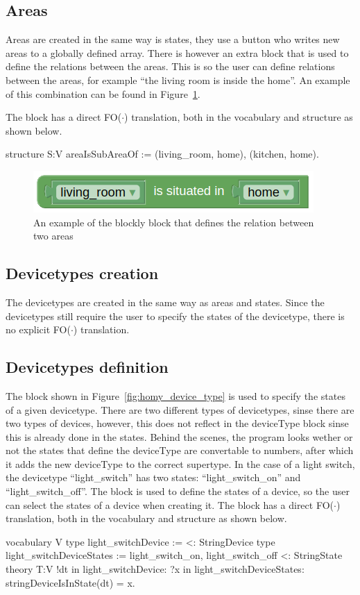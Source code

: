 \documentclass[11pt,a4paper]{report}
\newcommand{\fodot}{FO($\cdot$)\xspace}
\begin{document}
\subsection{Areas}
Areas are created in the same way is states, they use a button who writes new areas to a globally defined array. There is however an extra block that is used to define the relations between the areas. This is so the user can define relations between the areas, for example ``the living room is inside the home''. An example of this combination can be found in Figure~\ref{fig:homy_area_relation}.

The block has a direct \fodot translation, both in the vocabulary and structure as shown below. 
\begin{idplisting}
structure S:V {
    areaIsSubAreaOf := {(living_room, home), (kitchen, home)}.
}
\end{idplisting}

\begin{figure}
    \centering
    \includegraphics[width=0.4\linewidth]{images/homy_area_relation.png}
    \caption{An example of the blockly block that defines the relation between two areas}
    \label{fig:homy_area_relation}
\end{figure}

\subsection{Devicetypes creation}
The devicetypes are created in the same way as areas and states. Since the devicetypes still require the user to specify the states of the devicetype, there is no explicit \fodot translation.

\subsection{Devicetypes definition}
The block shown in Figure~\ref{fig:homy_device_type} is used to specify the states of a given devicetype. There are two different types of devicetypes, sinse there are two types of devices, however, this does not reflect in the deviceType block sinse this is already done in the states. Behind the scenes, the program looks wether or not the states that define the deviceType are convertable to numbers, after which it adds the new deviceType to the correct supertype. In the case of a light switch, the devicetype ``light\_switch'' has two states: ``light\_switch\_on'' and ``light\_switch\_off''. The block is used to define the states of a device, so the user can select the states of a device when creating it. The block has a direct \fodot translation, both in the vocabulary and structure as shown below.
\begin{idplisting}
vocabulary V {
    type light_switchDevice := {} <: StringDevice
    type light_switchDeviceStates := {light_switch_on, light_switch_off} <: StringState
}
theory T:V {
    !dt in light_switchDevice: ?x in light_switchDeviceStates: stringDeviceIsInState(dt) = x.
}
\end{idplisting}
\end{document}
